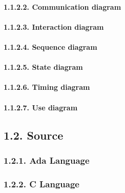 \documentclass[
]{article}
\begin{document}
\hypertarget{communication-diagram}{%
\paragraph{1.1.2.2. Communication diagram}\label{communication-diagram}}

\hypertarget{interaction-diagram}{%
\paragraph{1.1.2.3. Interaction diagram}\label{interaction-diagram}}

\hypertarget{sequence-diagram}{%
\paragraph{1.1.2.4. Sequence diagram}\label{sequence-diagram}}

\hypertarget{state-diagram}{%
\paragraph{1.1.2.5. State diagram}\label{state-diagram}}

\hypertarget{timing-diagram}{%
\paragraph{1.1.2.6. Timing diagram}\label{timing-diagram}}

\hypertarget{use-diagram}{%
\paragraph{1.1.2.7. Use diagram}\label{use-diagram}}

\hypertarget{source}{%
\subsection{1.2. Source}\label{source}}

\hypertarget{ada-language}{%
\subsubsection{1.2.1. Ada Language}\label{ada-language}}

\hypertarget{c-language}{%
\subsubsection{1.2.2. C Language}\label{c-language}}
\end{document}
